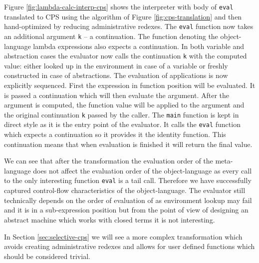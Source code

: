 Figure \ref{fig:lambda-calc-interp-cps} shows the interpreter with body of \lstinline!eval! translated to CPS using the algorithm of Figure \ref{fig:cps-translation} and then hand-optimized by reducing administrative redexes.
The \lstinline!eval! function now takes an additional argument \lstinline!k! -- a continuation.
The function denoting the object-language lambda expressions also expects a continuation.
In both variable and abstraction cases the evaluator now calls the continuation \lstinline!k! with the computed value: either looked up in the environment in case of a variable or freshly constructed in case of abstractions.
The evaluation of applications is now explicitly sequenced.
First the expression in function position will be evaluated.
It is passed a continuation which will then evaluate the argument.
After the argument is computed, the function value will be applied to the argument and the original continuation \lstinline!k! passed by the caller.
The \lstinline!main! function is kept in direct style as it is the entry point of the evaluator.
It calls the \lstinline!eval! function which expects a continuation so it provides it the identity function.
This continuation means that when evaluation is finished it will return the final value.

We can see that after the transformation the evaluation order of the meta-language does not affect the evaluation order of the object-language as every call to the only interesting function \lstinline!eval! is a tail call.
Therefore we have successfully captured control-flow characteristics of the object-language.
The evaluator still technically depends on the order of evaluation of \IDL{} as environment lookup may fail and it is in a sub-expression position but from the point of view of designing an abstract machine which works with closed terms it is not interesting.

In Section \ref{sec:selective-cps} we will see a more complex transformation which avoids creating administrative redexes and allows for user defined functions which should be considered trivial.

